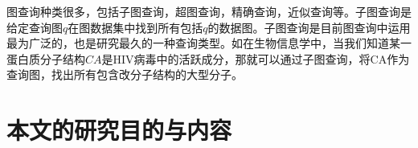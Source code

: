 \documentclass{XDBAthesis}
\begin{document}
图查询种类很多，包括子图查询，超图查询，精确查询，近似查询等\cite{g13}。子图查询是给定查询图$q$在图数据集中找到所有包括$q$的数据图。子图查询是目前图查询中运用最为广泛的，也是研究最久的一种查询类型。如在生物信息学中\cite{g13}，当我们知道某一蛋白质分子结构$CA$是HIV病毒中的活跃成分，那就可以通过子图查询，将CA作为查询图，找出所有包含改分子结构的大型分子。

\section{本文的研究目的与内容}
\ifx\allfiles\undefined
\renewcommand\refname{参考文献}
%

\end{document}
